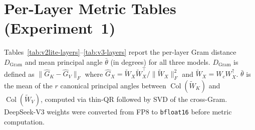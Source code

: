 %

\section{Per-Layer Metric Tables (Experiment~1)}
\label{app:per-layer-tables}

Tables~\ref{tab:v2lite-layers}--\ref{tab:v3-layers} report the per-layer
Gram distance $D_\text{Gram}$ and mean principal angle $\bar\theta$ (in
degrees) for all three models.
$D_\text{Gram}$ is defined as
$\|\hat{G}_K - \hat{G}_V\|_F$ where
$\hat{G}_X = \widetilde{W}_X\widetilde{W}_X^\top /
              \|\widetilde{W}_X\|_F^2$
and $\widetilde{W}_X = W_c W_X^\uparrow$.
$\bar\theta$ is the mean of the $r$ canonical principal angles between
$\operatorname{Col}(\widetilde{W}_K)$ and
$\operatorname{Col}(\widetilde{W}_V)$, computed via thin-QR followed by
SVD of the cross-Gram.
DeepSeek-V3 weights were converted from FP8 to \texttt{bfloat16} before
metric computation.

